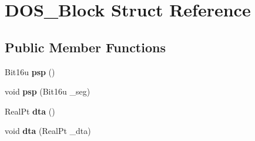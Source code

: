 \hypertarget{structDOS__Block}{\section{D\-O\-S\-\_\-\-Block Struct Reference}
\label{structDOS__Block}
}
\subsection*{Public Member Functions}
\begin{DoxyCompactItemize}
\item 
\hypertarget{structDOS__Block_abf44247b3618e280c8a180fb9544b716}{Bit16u {\bfseries psp} ()}\label{structDOS__Block_abf44247b3618e280c8a180fb9544b716}

\item 
\hypertarget{structDOS__Block_a261a87e3a25bcffa1d66c99cb5252f35}{void {\bfseries psp} (Bit16u \-\_\-seg)}\label{structDOS__Block_a261a87e3a25bcffa1d66c99cb5252f35}

\item 
\hypertarget{structDOS__Block_a2d5663e3633c7d0c58f11cb34fe03c29}{Real\-Pt {\bfseries dta} ()}\label{structDOS__Block_a2d5663e3633c7d0c58f11cb34fe03c29}

\item 
\hypertarget{structDOS__Block_acf5538274b4457e75a06579593b60768}{void {\bfseries dta} (Real\-Pt \-\_\-dta)}\label{structDOS__Block_acf5538274b4457e75a06579593b60768}

\end{DoxyCompactItemize}
